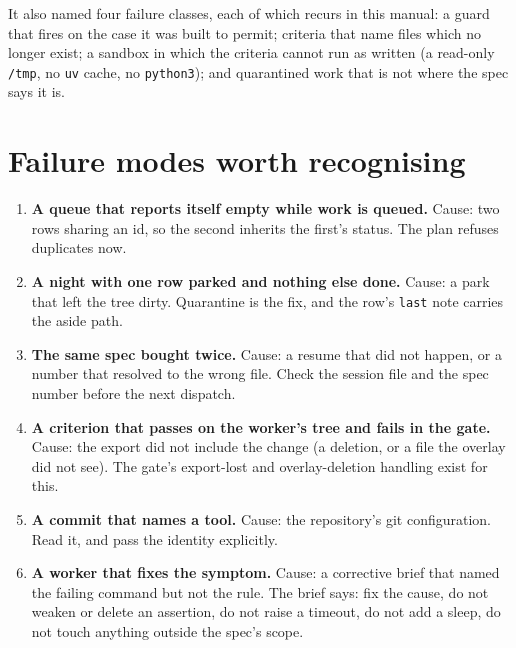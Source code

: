 It also named four failure classes, each of which recurs in this manual: a guard that fires on
the case it was built to permit; criteria that name files which no longer exist; a sandbox in
which the criteria cannot run as written (a read-only \texttt{/tmp}, no \texttt{uv} cache, no
\texttt{python3}); and quarantined work that is not where the spec says it is.

\section{Failure modes worth recognising}

\begin{enumerate}
	\item \textbf{A queue that reports itself empty while work is queued.} Cause: two rows
	sharing an id, so the second inherits the first's status. The plan refuses duplicates now.
	\item \textbf{A night with one row parked and nothing else done.} Cause: a park that left
	the tree dirty. Quarantine is the fix, and the row's \texttt{last} note carries the aside
	path.
	\item \textbf{The same spec bought twice.} Cause: a resume that did not happen, or a number
	that resolved to the wrong file. Check the session file and the spec number before the next
	dispatch.
	\item \textbf{A criterion that passes on the worker's tree and fails in the gate.} Cause:
	the export did not include the change (a deletion, or a file the overlay did not see). The
	gate's export-lost and overlay-deletion handling exist for this.
	\item \textbf{A commit that names a tool.} Cause: the repository's git configuration. Read
	it, and pass the identity explicitly.
	\item \textbf{A worker that fixes the symptom.} Cause: a corrective brief that named the
	failing command but not the rule. The brief says: fix the cause, do not weaken or delete an
	assertion, do not raise a timeout, do not add a sleep, do not touch anything outside the
	spec's scope.
\end{enumerate}
